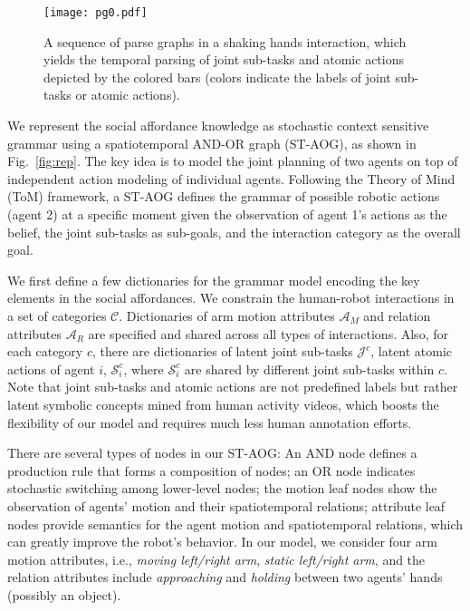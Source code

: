 \documentclass[letterpaper, 10 pt, conference]{ieeeconf}  %
\begin{document}
   \begin{figure*}[t!]
      \centering
      \texttt{[image: pg0.pdf]}
      \vspace{-10pt}
      \caption{A sequence of parse graphs in a shaking hands interaction, which yields the temporal parsing of joint sub-tasks and atomic actions depicted by the colored bars (colors indicate the labels of joint sub-tasks or atomic actions).}
      \vspace{-10pt}
      \label{fig:pg}
   \end{figure*}

   
   
   We represent the social affordance knowledge as stochastic context sensitive grammar using a spatiotemporal AND-OR graph (ST-AOG), as shown in Fig.~\ref{fig:rep}. The key idea is to model the joint planning of two agents on top of independent action modeling of individual agents. Following the Theory of Mind (ToM) framework, a ST-AOG defines the grammar of possible robotic actions (agent 2) at a specific moment given the observation of agent 1's actions as the belief, the joint sub-tasks as sub-goals, and the interaction category as the overall goal.%
   
   We first define a few dictionaries for the grammar model encoding the key elements in the social affordances. We constrain the human-robot interactions in a set of categories $\mathcal{C}$. Dictionaries of arm motion attributes $\mathcal{A}_M$ and relation attributes $\mathcal{A}_R$ are specified and shared across all types of interactions. Also, for each category $c$, there are dictionaries of latent joint sub-tasks $\mathcal{J}^c$, latent atomic actions of agent $i$, $\mathcal{S}_i^c$, where $\mathcal{S}_i^c$ are shared by different joint sub-tasks within $c$. Note that joint sub-tasks and atomic actions are not predefined labels but rather latent symbolic concepts mined from human activity videos, which boosts the flexibility of our model and requires much less human annotation efforts.
   
   There are several types of nodes in our ST-AOG: An AND node defines a production rule that forms a composition of nodes; an OR node indicates stochastic switching among lower-level nodes; the motion leaf nodes show the observation of agents' motion and their spatiotemporal relations; attribute leaf nodes provide semantics for the agent motion and spatiotemporal relations, which can greatly improve the robot's behavior. In our model, we consider four arm motion attributes, i.e., \textit{moving left/right arm}, \textit{static left/right arm}, and the relation attributes include \textit{approaching} and \textit{holding} between two agents' hands (possibly an object).
   
\end{document}
